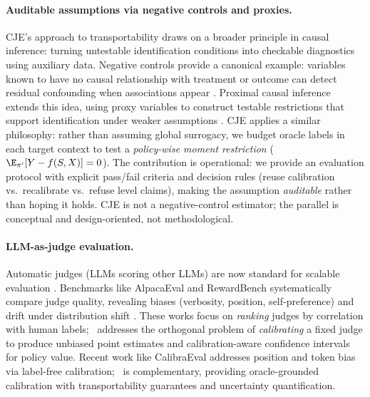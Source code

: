 \paragraph{Auditable assumptions via negative controls and proxies.}
CJE's approach to transportability draws on a broader principle in causal inference: turning untestable identification conditions into checkable diagnostics using auxiliary data.
Negative controls provide a canonical example: variables known to have no causal relationship with treatment or outcome can detect residual confounding when associations appear \citep{Lipsitch2010}.
Proximal causal inference extends this idea, using proxy variables to construct testable restrictions that support identification under weaker assumptions \citep{TchetgenTchetgen2024}.
CJE applies a similar philosophy: rather than assuming global surrogacy, we budget oracle labels in each target context to test a \emph{policy-wise moment restriction} ($\E_{\pi'}[Y - f(S,X)] = 0$).
The contribution is operational: we provide an evaluation protocol with explicit pass/fail criteria and decision rules (reuse calibration vs.\ recalibrate vs.\ refuse level claims), making the assumption \emph{auditable} rather than hoping it holds.
CJE is not a negative-control estimator; the parallel is conceptual and design-oriented, not methodological.

\paragraph{LLM-as-judge evaluation.}
Automatic judges (LLMs scoring other LLMs) are now standard for scalable evaluation \citep{Zheng2023LLMasJudge,Kim2024PrometheusJudge,KocmiFedermann2023}.
Benchmarks like AlpacaEval \citep{DuboisLiTaoriEtAl2024AlpacaEval} and RewardBench \citep{LambertPiechChenEtAl2024RewardBench} systematically compare judge quality, revealing biases (verbosity, position, self-preference) and drift under distribution shift \citep{DietzEtAl2025LLMJudges}.
These works focus on \emph{ranking} judges by correlation with human labels; \CJE\ addresses the orthogonal problem of \emph{calibrating} a fixed judge to produce unbiased point estimates and calibration-aware confidence intervals for policy value.
Recent work like CalibraEval \citep{Li2025CalibraEval} addresses position and token bias via label-free calibration; \CJE\ is complementary, providing oracle-grounded calibration with transportability guarantees and uncertainty quantification.

